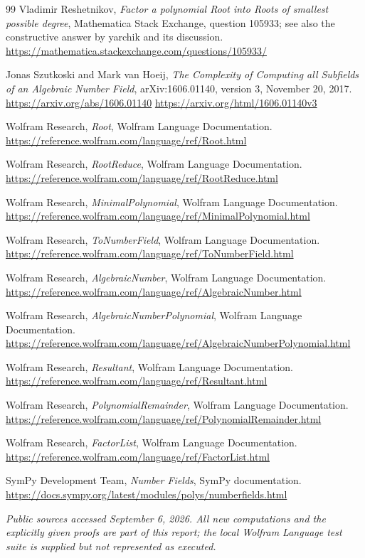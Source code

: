 \documentclass[11pt,a4paper]{article}
\theoremstyle{remark}\newtheorem{remark}[theorem]{Remark}
\begin{document}
\begin{thebibliography}{99}
Vladimir Reshetnikov, \emph{Factor a polynomial Root into Roots of smallest possible degree}, Mathematica Stack Exchange, question 105933; see also the constructive answer by yarchik and its discussion.\newline
\url{https://mathematica.stackexchange.com/questions/105933/}

Jonas Szutkoski and Mark van Hoeij, \emph{The Complexity of Computing all Subfields of an Algebraic Number Field}, arXiv:1606.01140, version 3, November 20, 2017.\newline
\url{https://arxiv.org/abs/1606.01140}\newline
\url{https://arxiv.org/html/1606.01140v3}

Wolfram Research, \emph{Root}, Wolfram Language Documentation.\newline
\url{https://reference.wolfram.com/language/ref/Root.html}

Wolfram Research, \emph{RootReduce}, Wolfram Language Documentation.\newline
\url{https://reference.wolfram.com/language/ref/RootReduce.html}

Wolfram Research, \emph{MinimalPolynomial}, Wolfram Language Documentation.\newline
\url{https://reference.wolfram.com/language/ref/MinimalPolynomial.html}

Wolfram Research, \emph{ToNumberField}, Wolfram Language Documentation.\newline
\url{https://reference.wolfram.com/language/ref/ToNumberField.html}

Wolfram Research, \emph{AlgebraicNumber}, Wolfram Language Documentation.\newline
\url{https://reference.wolfram.com/language/ref/AlgebraicNumber.html}

Wolfram Research, \emph{AlgebraicNumberPolynomial}, Wolfram Language Documentation.\newline
\url{https://reference.wolfram.com/language/ref/AlgebraicNumberPolynomial.html}

Wolfram Research, \emph{Resultant}, Wolfram Language Documentation.\newline
\url{https://reference.wolfram.com/language/ref/Resultant.html}

Wolfram Research, \emph{PolynomialRemainder}, Wolfram Language Documentation.\newline
\url{https://reference.wolfram.com/language/ref/PolynomialRemainder.html}

Wolfram Research, \emph{FactorList}, Wolfram Language Documentation.\newline
\url{https://reference.wolfram.com/language/ref/FactorList.html}

SymPy Development Team, \emph{Number Fields}, SymPy documentation.\newline
\url{https://docs.sympy.org/latest/modules/polys/numberfields.html}
\end{thebibliography}
\small\textit{Public sources accessed September 6, 2026. All new computations and the explicitly given proofs are part of this report; the local Wolfram Language test suite is supplied but not represented as executed.}
\end{document}
